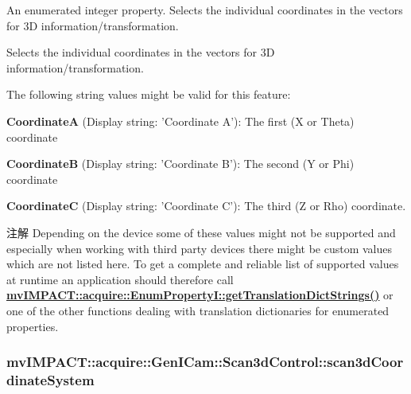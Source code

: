 An enumerated integer property. Selects the individual coordinates in the vectors for 3\+D information/transformation. 

Selects the individual coordinates in the vectors for 3\+D information/transformation.

The following string values might be valid for this feature\+:
\begin{DoxyItemize}
\item {\bfseries Coordinate\+A} (Display string\+: 'Coordinate A')\+: The first (X or Theta) coordinate
\item {\bfseries Coordinate\+B} (Display string\+: 'Coordinate B')\+: The second (Y or Phi) coordinate
\item {\bfseries Coordinate\+C} (Display string\+: 'Coordinate C')\+: The third (Z or Rho) coordinate.
\end{DoxyItemize}

\begin{DoxyNote}{注解}
Depending on the device some of these values might not be supported and especially when working with third party devices there might be custom values which are not listed here. To get a complete and reliable list of supported values at runtime an application should therefore call {\bfseries \hyperlink{classmv_i_m_p_a_c_t_1_1acquire_1_1_enum_property_i_a0ba6ccbf5ee69784d5d0b537924d26b6}{mv\+I\+M\+P\+A\+C\+T\+::acquire\+::\+Enum\+Property\+I\+::get\+Translation\+Dict\+Strings()}} or one of the other functions dealing with translation dictionaries for enumerated properties. 
\end{DoxyNote}
\hypertarget{classmv_i_m_p_a_c_t_1_1acquire_1_1_gen_i_cam_1_1_scan3d_control_a2a7abf5a96c5142310d317c63c2c0b4f}{
\subsubsection[{scan3d\+Coordinate\+System}]{ mv\+I\+M\+P\+A\+C\+T\+::acquire\+::\+Gen\+I\+Cam\+::\+Scan3d\+Control\+::scan3d\+Coordinate\+System}}\label{classmv_i_m_p_a_c_t_1_1acquire_1_1_gen_i_cam_1_1_scan3d_control_a2a7abf5a96c5142310d317c63c2c0b4f}


